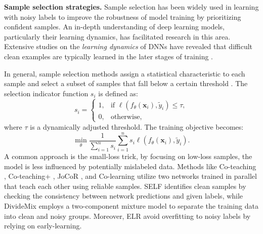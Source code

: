 \textbf{Sample selection strategies.}
Sample selection has been widely used in learning with noisy labels to improve the robustness of model training by prioritizing confident samples. An in-depth understanding of deep learning models, particularly their learning dynamics, has facilitated research in this area. Extensive studies on the \textit{learning dynamics} of DNNs have revealed that difficult clean examples are typically learned in the later stages of training \cite{arpit2017closer, toneva2018empirical, lin2024on}. 

In general, sample selection methods assign a statistical characteristic to each sample and select a subset of samples that fall below a certain threshold \cite{han2018co}. The selection indicator function \( s_i \) is defined as:
\begin{equation}
s_i = \begin{cases}
1, & \text{if } \ell\left(f_\theta(\mathbf{x}_i), \tilde{y}_i\right) \leq \tau, \\
0, & \text{otherwise},
\label{eq11}
\end{cases}
\end{equation}
where \( \tau \) is a dynamically adjusted threshold. The training objective becomes:
\begin{equation}
\min_{\theta} \frac{1}{\sum_{i=1}^n s_i} \sum_{i=1}^n s_i \ell\left(f_\theta(\mathbf{x}_i), \tilde{y}_i\right).
\end{equation}
A common approach is the small-loss trick, by focusing on low-loss samples, the model is less influenced by potentially mislabeled data. Methods like Co-teaching \cite{han2018co}, Co-teaching+ \cite{yu2019does}, JoCoR \cite{wei2020combating}, and Co-learning \cite{tan2021co} utilize two networks trained in parallel that teach each other using reliable samples. SELF \cite{nguyen2019self} identifies clean samples by checking the consistency between network predictions and given labels, while DivideMix \cite{li2020dividemix} employs a two-component mixture model to separate the training data into clean and noisy groups.
Moreover, ELR \cite{liu2020early} avoid overfitting to noisy labels by relying on early-learning.


